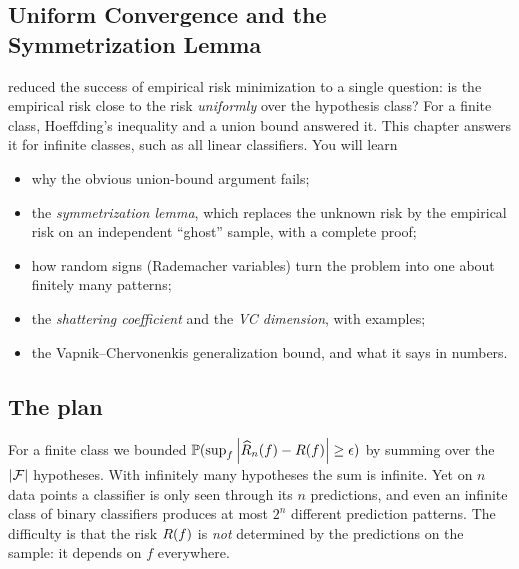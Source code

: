 \begin{notechapter}
\chapter[Uniform Convergence and the Symmetrization Lemma]{Uniform Convergence and the\texorpdfstring{\\}{ } Symmetrization Lemma}\label{ch:symmetrization-lemma}

\begin{chapterintro}
 reduced the success of empirical risk minimization to a single
question: is the empirical risk close to the risk \emph{uniformly} over the
hypothesis class? For a finite class, Hoeffding's inequality and a union bound
answered it. This chapter answers it for infinite classes, such as all linear
classifiers. You will learn
\begin{itemize}[nosep]
  \item why the obvious union-bound argument fails;
  \item the \emph{symmetrization lemma}, which replaces the unknown risk by the
        empirical risk on an independent ``ghost'' sample, with a complete
        proof;
  \item how random signs (Rademacher variables) turn the problem into one about
        finitely many patterns;
  \item the \emph{shattering coefficient} and the \emph{VC dimension}, with
        examples;
  \item the Vapnik--Chervonenkis generalization bound, and what it says in
        numbers.
\end{itemize}
\end{chapterintro}

\section{The plan}\label{symmetrization-lemma:sec:plan}

For a finite class we bounded $\mathbb{P}(\sup_f \left|\widehat{R}_n(f) - R(f)\right| \geq \epsilon)$
by summing over the $\left|\mathcal{F}\right|$ hypotheses. With infinitely many hypotheses the
sum is infinite. Yet on $n$ data points a classifier is only seen through its
$n$ predictions, and even an infinite class of binary classifiers produces at
most $2^n$ different prediction patterns. The difficulty is that the risk
$R(f)$ is \emph{not} determined by the predictions on the sample: it
depends on $f$ everywhere.


\end{notechapter}
